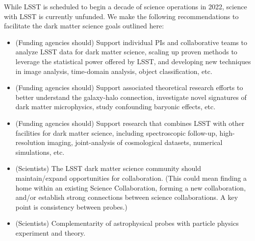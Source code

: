 \documentclass[12pt]{article}
\begin{document}
While LSST is scheduled to begin a decade of science operations in 2022, science with LSST is currently unfunded.
We make the following recommendations to facilitate the dark matter science goals outlined here:

\begin{itemize}[noitemsep]

    \item (Funding agencies should) Support individual PIs and collaborative teams to analyze LSST data for dark matter science, scaling up proven methods to leverage the statistical power offered by LSST, and developing new techniques in image analysis, time-domain analysis, object classification, etc.
    \item (Funding agencies should) Support associated theoretical research efforts to better understand the galaxy-halo connection, investigate novel signatures of dark matter microphysics, study confounding baryonic effects, etc.
    
    \item (Funding agencies should) Support research that combines LSST with other facilities for dark matter science, including spectroscopic follow-up, high-resolution imaging, joint-analysis of cosmological datasets, numerical simulations, etc.
    
    \item (Scientists) The LSST dark matter science community should maintain/expand opportunities for collaboration. (This could mean finding a home within an existing Science Collaboration, forming a new collaboration, and/or establish strong connections between science collaborations. A key point is consistency between probes.)
    
    \item (Scientists) Complementarity of astrophysical probes with particle physics experiment and theory. 
    
\end{itemize}
\end{document}
